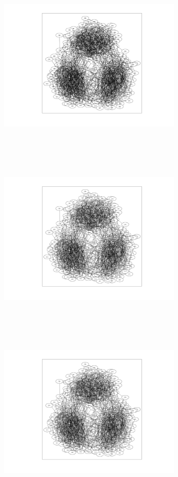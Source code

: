 \includegraphics[width=9.0cm,height=9.0cm]{images/GraphTheory/WellConnectedWithThreeClusters.jpg}
\includegraphics[width=9.0cm,height=9.0cm]{images/GraphTheory/WellConnectedWithThreeClusters2.jpg}
\includegraphics[width=9.0cm,height=9.0cm]{images/GraphTheory/WellConnectedWithThreeClusters3.jpg}
